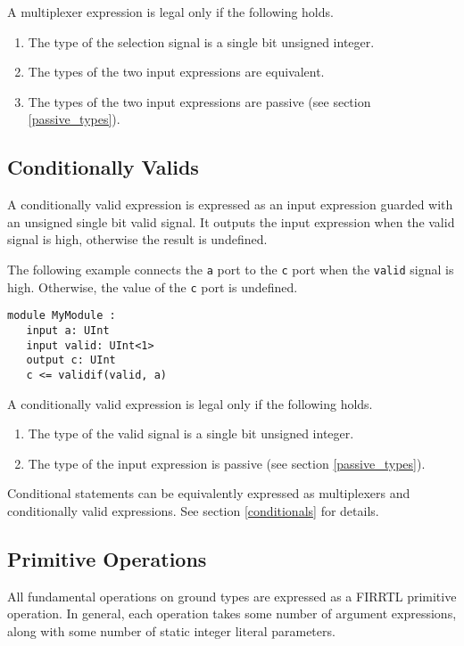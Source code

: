 \documentclass[12pt]{article}
\begin{document}
A multiplexer expression is legal only if the following holds.
\begin{enumerate}
\item The type of the selection signal is a single bit unsigned integer.
\item The types of the two input expressions are equivalent.
\item The types of the two input expressions are passive (see section \ref{passive_types}).
\end{enumerate}

\subsection{Conditionally Valids} \label{conditionally_valids}

A conditionally valid expression is expressed as an input expression guarded with an unsigned single bit valid signal. It outputs the input expression when the valid signal is high, otherwise the result is undefined.

The following example connects the \verb|a| port to the \verb|c| port when the \verb|valid| signal is high. Otherwise, the value of the \verb|c| port is undefined.
\begin{lstlisting}
module MyModule :
   input a: UInt
   input valid: UInt<1>
   output c: UInt
   c <= validif(valid, a)
\end{lstlisting}

A conditionally valid expression is legal only if the following holds.
\begin{enumerate}
\item The type of the valid signal is a single bit unsigned integer.
\item The type of the input expression is passive (see section \ref{passive_types}).
\end{enumerate}

Conditional statements can be equivalently expressed as multiplexers and conditionally valid expressions. See section \ref{conditionals} for details.

\subsection{Primitive Operations}

All fundamental operations on ground types are expressed as a FIRRTL primitive operation. In general, each operation takes some number of argument expressions, along with some number of static integer literal parameters.
\end{document}
